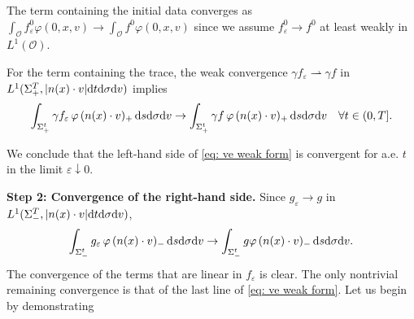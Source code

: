 \documentclass[10pt, reqno]{amsart}
\theoremstyle{plain}
\theoremstyle{definition}
\theoremstyle{remark}
\numberwithin{equation}{section}
\newcommand{\calO}{\mathcal O}
\newcommand{\ve}{\varepsilon}
\newcommand{\dv}{\textnormal{d}v}
\newcommand{\dt}{\textnormal{d}t}
\newcommand{\ds}{\textnormal{d}s}
\newcommand{\tnd}{\textnormal{d}}
\newcommand{\weakto}{\rightharpoonup}
\begin{document}
The term containing the initial data converges as $\int_{\calO} f_\ve^0 \varphi(0,x,v) \to \int_{\calO} f^0 \varphi(0,x,v)$ since we assume $f_\ve^0 \to f^0$ at least weakly in $L^1(\calO)$.

For the term containing the trace, the weak convergence $\gamma f_\ve \weakto \gamma f$ in $L^1(\Sigma_+^T, |n(x)\cdot v|\dt\tnd\sigma\dv)$ implies
\[
    \int_{\Sigma_+^t} \gamma f_\ve \, \varphi \, (n(x)\cdot v)_+ \,\ds\tnd\sigma\dv \to \int_{\Sigma_+^t} \gamma f \, \varphi \, (n(x)\cdot v)_+ \,\ds\tnd\sigma\dv \quad \forall t\in (0,T].
\]

We conclude that the left-hand side of \eqref{eq: ve weak form} is convergent for a.e. $t$ in the limit $\ve\downarrow 0$.
%
%
%
%
%
%

\medskip
\noindent \textbf{Step 2: Convergence of the right-hand side.}  Since $g_\ve \to g$ in $L^1(\Sigma_-^T, |n(x)\cdot v| \dt\tnd\sigma\dv)$,
\begin{align*}
    \int_{\Sigma_-^t} g_\ve \, \varphi \, (n(x)\cdot v)_- \,\ds\tnd\sigma\dv \to \int_{\Sigma_-^t} g \varphi \, (n(x)\cdot v)_- \,\ds\tnd\sigma\dv.
\end{align*}
The convergence of the terms that are linear in $f_\ve$ is clear. The only nontrivial remaining convergence is that of the last line of \eqref{eq: ve weak form}. Let us begin by demonstrating
\end{document}
